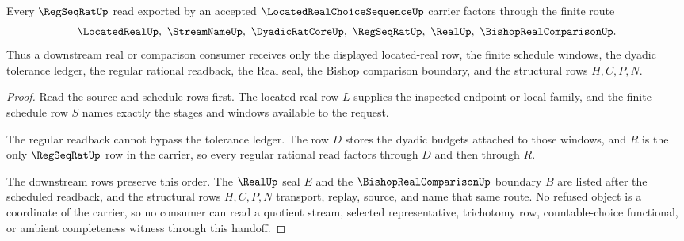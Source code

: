 \begin{theorem}
\label{thm:located-real-choice-sequence-regseqrat-window-handoff}
Every $\RegSeqRatUp$ read exported by an accepted $\LocatedRealChoiceSequenceUp$ carrier factors through the finite route
$$
\LocatedRealUp,\ \StreamNameUp,\ \DyadicRatCoreUp,\ \RegSeqRatUp,\ \RealUp,\ \BishopRealComparisonUp .
$$
Thus a downstream real or comparison consumer receives only the displayed located-real row, the finite schedule windows, the dyadic tolerance ledger, the regular rational readback, the Real seal, the Bishop comparison boundary, and the structural rows $H,C,P,N$.
\end{theorem}
\begin{proof}
Read the source and schedule rows first. The located-real row $L$ supplies the inspected endpoint or local family, and the finite schedule row $S$ names exactly the stages and windows available to the request.

The regular readback cannot bypass the tolerance ledger. The row $D$ stores the dyadic budgets attached to those windows, and $R$ is the only $\RegSeqRatUp$ row in the carrier, so every regular rational read factors through $D$ and then through $R$.

The downstream rows preserve this order. The $\RealUp$ seal $E$ and the $\BishopRealComparisonUp$ boundary $B$ are listed after the scheduled readback, and the structural rows $H,C,P,N$ transport, replay, source, and name that same route. No refused object is a coordinate of the carrier, so no consumer can read a quotient stream, selected representative, trichotomy row, countable-choice functional, or ambient completeness witness through this handoff.
\end{proof}




